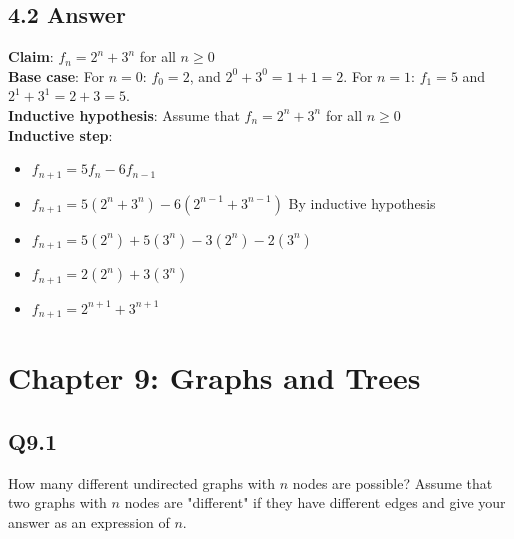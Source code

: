 \documentclass{article}
\begin{document}
\subsection*{4.2 Answer}
\textbf{Claim}: $f_n=2^n+3^n$ for all $n\geq0$
\\ \textbf{Base case}: For $n=0$: $f_0=2$, and $2^0+3^0=1+1=2$. For $n=1$: $f_1=5$ and $2^1+3^1=2+3=5$.
\\ \textbf{Inductive hypothesis}: Assume that $f_n=2^n+3^n$ for all $n\geq0$
\\ \textbf{Inductive step}:
\begin{itemize}[label=]
    \item $f_{n+1}=5f_n-6f_{n-1}$
    \item $f_{n+1}=5(2^n+3^n)-6(2^{n-1}+3^{n-1})$ By inductive hypothesis
    \item $f_{n+1}=5(2^n)+5(3^n)-3(2^n)-2(3^n)$
    \item $f_{n+1}=2(2^n)+3(3^n)$
    \item $f_{n+1}=2^{n+1}+3^{n+1}$
\end{itemize}
\newpage
\section*{Chapter 9: Graphs and Trees}
\subsection*{Q9.1}
How many different undirected graphs with $n$ nodes are possible? Assume that two graphs with $n$ nodes are "different" if they have different edges and give your answer as an expression of $n$.
\newpage
\end{document}
